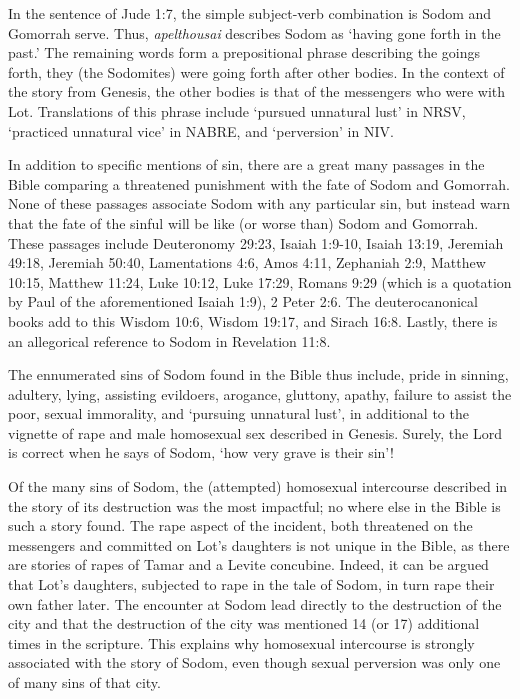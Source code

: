 \documentclass[10pt]{article}
\begin{document}
In the sentence of Jude 1:7, the simple subject-verb combination is Sodom and Gomorrah serve. Thus, \textit{apelthousai} describes Sodom as `having gone forth in the past.' The remaining words form a prepositional phrase describing the goings forth, they (the Sodomites) were going forth after other bodies. In the context of the story from Genesis, the other bodies is that of the messengers who were with Lot. Translations of this phrase include `pursued unnatural lust' in NRSV, `practiced unnatural vice' in NABRE, and `perversion' in NIV. 

In addition to specific mentions of sin, there are a great many passages in the Bible comparing a threatened punishment with the fate of Sodom and Gomorrah. None of these passages associate Sodom with any particular sin, but instead warn that the fate of the sinful will be like (or worse than) Sodom and Gomorrah. These passages include Deuteronomy 29:23, Isaiah 1:9-10, Isaiah 13:19, Jeremiah 49:18, Jeremiah 50:40, Lamentations 4:6, Amos 4:11, Zephaniah 2:9, Matthew 10:15, Matthew 11:24, Luke 10:12, Luke 17:29, Romans 9:29 (which is a quotation by Paul of the aforementioned Isaiah 1:9), 2 Peter 2:6. The deuterocanonical books add to this Wisdom 10:6, Wisdom 19:17, and Sirach 16:8. Lastly, there is an allegorical reference to Sodom in Revelation 11:8. 

The ennumerated sins of Sodom found in the Bible thus include, pride in sinning, adultery, lying, assisting evildoers, arogance, gluttony, apathy, failure to assist the poor, sexual immorality, and `pursuing unnatural lust', in additional to the vignette of rape and male homosexual sex described in Genesis. Surely, the Lord is correct when he says of Sodom, `how very grave is their sin'!

Of the many sins of Sodom, the (attempted) homosexual intercourse described in the story of its destruction was the most impactful; no where else in the Bible is such a story found. The rape aspect of the incident, both threatened on the messengers and committed on Lot's daughters is not unique in the Bible, as there are stories of rapes of Tamar and a Levite concubine. Indeed, it can be argued that Lot's daughters, subjected to rape in the tale of Sodom, in turn rape their own father later. The encounter at Sodom lead directly to the destruction of the city and that the destruction of the city was mentioned 14 (or 17) additional times in the scripture. This explains why homosexual intercourse is strongly associated with the story of Sodom, even though sexual perversion was only one of many sins of that city.
\end{document}
